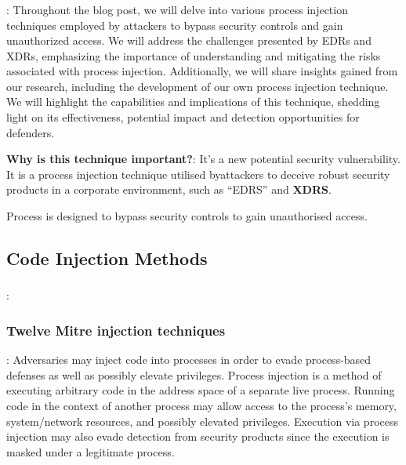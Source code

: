 \documentclass{article}
\begin{document}
\subsubsection{\textcite{Peixoto:2023}}
\textbf{}: Throughout the blog post, we will delve into various process injection techniques employed by attackers to bypass security controls and gain unauthorized access. We will address the challenges presented by EDRs and XDRs, emphasizing the importance of understanding and mitigating the risks associated with process injection. Additionally, we will share insights gained from our research, including the development of our own process injection technique. We will highlight the capabilities and implications of this technique, shedding light on its effectiveness, potential impact and detection opportunities for defenders.

\textbf{Why is this technique important?}: It's a new potential security vulnerability. It is a process injection
technique utilised byattackers to deceive robust security products in a corporate environment, such as ``EDRS'' and \textbf{XDRS}.

Process is designed to bypass security controls to gain unauthorised access.

\subsection{Code Injection Methods}

\subsubsection{\textcite{Oosthoek:2019}}
\textbf{}: 


\subsubsection{\textcite{Mitre:2017} Twelve Mitre injection techniques}
\textbf{}: Adversaries may inject code into processes in order to evade process-based defenses as well as possibly elevate privileges. Process injection is a method of executing arbitrary code in the address space of a separate live process. Running code in the context of another process may allow access to the process's memory, system/network resources, and possibly elevated privileges. Execution via process injection may also evade detection from security products since the execution is masked under a legitimate process. 
\end{document}
